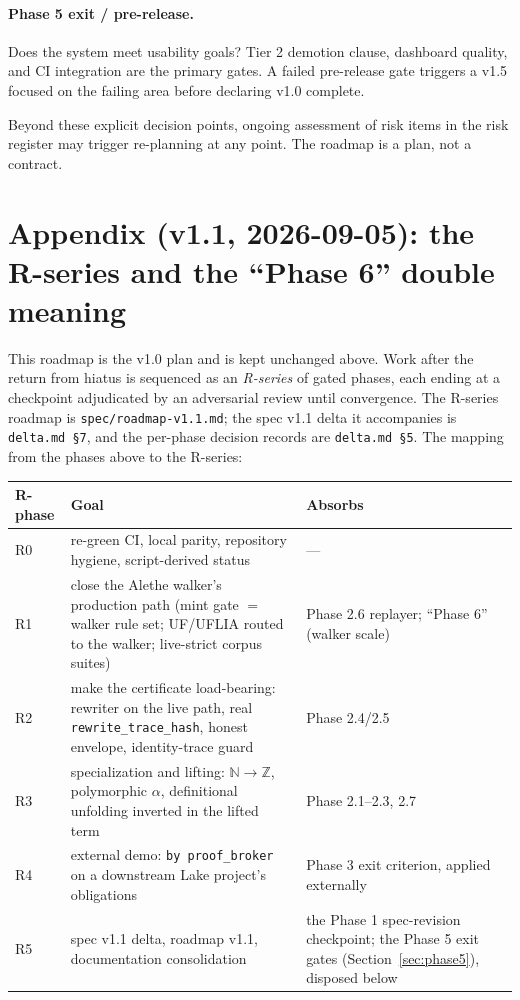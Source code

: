 \documentclass[11pt,letterpaper]{article}
\begin{document}
\paragraph{Phase 5 exit / pre-release.} Does the system meet usability
goals? Tier 2 demotion clause, dashboard quality, and CI integration
are the primary gates. A failed pre-release gate triggers a v1.5
focused on the failing area before declaring v1.0 complete.

Beyond these explicit decision points, ongoing assessment of risk
items in the risk register may trigger re-planning at any point.
The roadmap is a plan, not a contract.


\newpage
\section*{Appendix (v1.1, 2026-09-05): the R-series and the ``Phase 6'' double meaning}

This roadmap is the v1.0 plan and is kept unchanged above. Work after
the return from hiatus is sequenced as an \emph{R-series} of gated
phases, each ending at a checkpoint adjudicated by an adversarial
review until convergence. The R-series roadmap is
\texttt{spec/roadmap-v1.1.md}; the spec v1.1 delta it accompanies is
\texttt{delta.md~\S7}, and the per-phase decision records are
\texttt{delta.md~\S5}. The mapping from the phases above to the
R-series:

\begin{tabularx}{\textwidth}{@{}l>{\hsize=1.25\hsize}X>{\hsize=0.75\hsize}X@{}}
\toprule
\textbf{R-phase} & \textbf{Goal} & \textbf{Absorbs} \\
\midrule
R0 & re-green CI, local parity, repository hygiene, script-derived status & --- \\
R1 & close the Alethe walker's production path (mint gate $=$ walker rule set; UF/UFLIA routed to the walker; live-strict corpus suites) & Phase 2.6 replayer; ``Phase 6'' (walker scale) \\
R2 & make the certificate load-bearing: rewriter on the live path, real \texttt{rewrite\_trace\_hash}, honest envelope, identity-trace guard & Phase 2.4/2.5 \\
R3 & specialization and lifting: $\mathbb{N}\to\mathbb{Z}$, polymorphic $\alpha$, definitional unfolding inverted in the lifted term & Phase 2.1--2.3, 2.7 \\
R4 & external demo: \texttt{by proof\_broker} on a downstream Lake project's obligations & Phase 3 exit criterion, applied externally \\
R5 & spec v1.1 delta, roadmap v1.1, documentation consolidation & the Phase 1 spec-revision checkpoint; the Phase 5 exit gates (Section~\ref{sec:phase5}), disposed below \\
\bottomrule
\end{tabularx}
\end{document}
